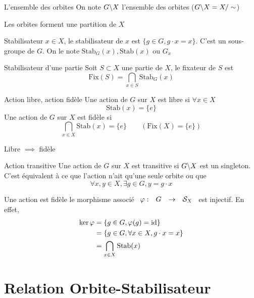 \documentclass[]{report}
\begin{document}
\begin{df}{L'ensemble des orbites}{}
    On note $G\backslash X$ l'ensemble des orbites ($G\backslash X=X/\sim$)
\end{df}

\begin{re}{}{}
    Les orbites forment une partition de $X$
\end{re}

\begin{df}{Stabilisateur}{}
    $x\in X$, le stabilisateur de $x$ est $\{g\in G, g\cdot x=x\}$. C'est un sous-groupe de $G$. On le note $\text{Stab}_G(x), \text{Stab}(x)$ ou $G_x$ 
\end{df}

\begin{df}{Stabilisateur d'une partie}{}
    Soit $S\subset X$ une partie de $X$, le fixateur de $S$ est
    \[\text{Fix}(S)=\bigcap_{x\in S}\text{Stab}_G(x)\]
\end{df}

\begin{df}{Action libre, action fidèle}{}
    Une action de $G$ sur $X$ est libre si $\forall x\in X$
    \[\text{Stab}(x)=\{e\}\]
    Une action de $G$ sur $X$ est fidèle si
    \[\bigcap_{x\in X}\text{Stab}(x)=\{e\}\qquad (\text{Fix}(X)=\{e\})\]
\end{df}

\begin{prop}{}{}
    Libre $\implies $ fidèle
\end{prop}

\begin{df}{Action transitive}{}
    Une action de $G$ sur $X$ est transitive si $G\backslash X$ est un singleton.\\
    C'est équivalent à ce que l'action n'ait qu'une seule orbite ou que
    \[\forall x,y\in X,\exists g\in G, y=g\cdot x\]
\end{df}

\begin{re}{}{}
    Une action est fidèle \ssi le morphisme associé $\begin{array}{ccccc} \varphi : & G & \to & \mathcal{S}_X \end{array}$ est injectif. En effet,
    \begin{align*}
        \ker \varphi&=\{g\in G,\varphi(g)=\text{id} \}\\
        &=\{g\in G,\forall x\in X,g\cdot x=x\}\\
        &=\bigcap_{x\in X} \text{Stab}(x)
    \end{align*}
\end{re}

\section{Relation Orbite-Stabilisateur}
\end{document}
